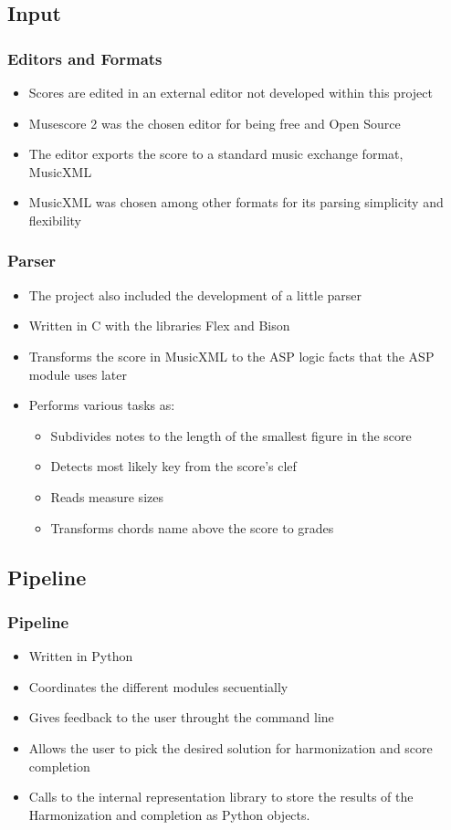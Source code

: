 \documentclass[english]{beamer}
\begin{document}
\subsection{Input}
	\begin{frame}
	\frametitle{Editors and Formats}
		\begin{itemize}
			\item Scores are edited in an external editor not developed within this project
			\item Musescore 2 was the chosen editor for being free and Open Source
			\item The editor exports the score to a standard music exchange format, MusicXML
			\item MusicXML was chosen among other formats for its parsing simplicity and flexibility
		\end{itemize}
	\end{frame}
	\begin{frame}
	\frametitle{Parser}
		\begin{itemize}
			\item The project also included the development of a little parser
			\item Written in C with the libraries Flex and Bison
			\item Transforms the score in MusicXML to the ASP logic facts that the ASP module uses later
			\item Performs various tasks as:
				\begin{itemize}
					\item Subdivides notes to the length of the smallest figure in the score
					\item Detects most likely key from the score's clef
					\item Reads measure sizes
					\item Transforms chords name above the score to grades
				\end{itemize}
		\end{itemize}
	\end{frame}
\subsection{Pipeline}
	\begin{frame}
	\frametitle{Pipeline}
		\begin{itemize}
			\item Written in Python
			\item Coordinates the different modules secuentially
			\item Gives feedback to the user throught the command line
			\item Allows the user to pick the desired solution for harmonization and score completion
			\item Calls to the internal representation library to store the results of the Harmonization and completion as Python objects.
		\end{itemize}
	\end{frame}
\end{document}

